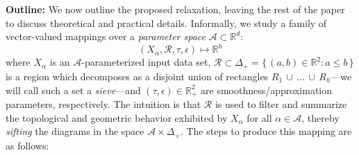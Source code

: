 \documentclass[10pt]{article}
\numberwithin{equation}{section}
\newcommand{\+}{%
	\raisebox{0.18ex}{\scaleobj{0.55}{+}}
}
\theoremstyle{definition}
\theoremstyle{definition}
\begin{document}
\\
\\
\noindent \textbf{Outline:} We now outline the proposed relaxation, leaving the rest of the paper to discuss theoretical and practical details. Informally, we study a family of vector-valued mappings over a \emph{parameter space} $\mathcal{A} \subset \mathbb{R}^d$: 
\begin{equation}\label{eq:relaxation_mapping}
	(X_\alpha, \mathcal{R}, \tau, \epsilon) \mapsto \mathbb{R}^{h}
\end{equation}
where $X_\alpha$ is an $\mathcal{A}$-parameterized input data set, $\mathcal{R} \subset \Delta_+  = \{\, (a,b) \in \mathbb{R}^2 : a \leq b \,\}$ is a region which decomposes as a disjoint union of rectangles $R_1 \, \cup \, \dots \, \cup \, R_h$---we will call such a set a \emph{sieve}---and $(\tau, \epsilon) \in \mathbb{R}_+^2$ are smoothness/approximation parameters, respectively.
The intuition is that $\mathcal{R}$ is used to filter and summarize the topological and geometric behavior exhibited by $X_\alpha$ for all $\alpha \in \mathcal{A}$, thereby \emph{sifting} the diagrams in the space $\mathcal{A} \times \Delta_+$. 
The steps to produce this mapping are as follows:
\end{document}
